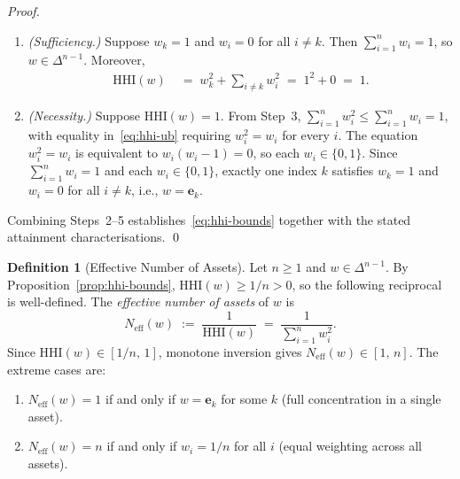 \documentclass[12pt,openany]{book}
\newcommand{\bfw}{\mathbf{w}}
\newcommand{\bfe}{\mathbf{e}}
\numberwithin{equation}{chapter}
\theoremstyle{plain}
\theoremstyle{definition}
\newtheorem{definition}[theorem]{Definition}
\theoremstyle{remark}
\def\bfw{w}%
\begin{document}
\begin{proof}
\begin{enumerate}
        \begin{enumerate}
          \item \emph{(Sufficiency.)}
                Suppose $w_k = 1$ and $w_i = 0$ for all $i \neq k$.
                Then $\sum_{i=1}^{n} w_i = 1$, so
                $\bfw \in \Delta^{n-1}$.  Moreover,
                \begin{align}
                  \mathrm{HHI}(\bfw)
                  &\;=\; w_k^2 + \sum_{i \neq k} w_i^2
                  \;=\; 1^2 + 0
                  \;=\; 1.
                  \label{eq:hhi-ub-suff}
                \end{align}

          \item \emph{(Necessity.)}
                Suppose $\mathrm{HHI}(\bfw) = 1$.
                From Step~3, $\sum_{i=1}^{n} w_i^2 \leq \sum_{i=1}^{n} w_i = 1$,
                with equality in~\eqref{eq:hhi-ub} requiring
                $w_i^2 = w_i$ for every $i$.
                The equation $w_i^2 = w_i$ is equivalent to
                $w_i(w_i - 1) = 0$, so each $w_i \in \{0,1\}$.
                Since $\sum_{i=1}^{n} w_i = 1$ and each $w_i \in \{0,1\}$,
                exactly one index $k$ satisfies $w_k = 1$ and
                $w_i = 0$ for all $i \neq k$,
                i.e., $\bfw = \bfe_k$.
        \end{enumerate}

\end{enumerate}

\noindent
Combining Steps~2--5 establishes~\eqref{eq:hhi-bounds} together
with the stated attainment characterisations.
\qed
\end{proof}

\begin{definition}[Effective Number of Assets]
\label{def:ena}
Let $n \geq 1$ and $\bfw \in \Delta^{n-1}$.
By Proposition~\ref{prop:hhi-bounds},
$\mathrm{HHI}(\bfw) \geq 1/n > 0$, so the following reciprocal
is well-defined.
The \emph{effective number of assets} of $\bfw$ is
\begin{equation}
  N_{\mathrm{eff}}(\bfw)
  \;:=\;
  \frac{1}{\mathrm{HHI}(\bfw)}
  \;=\;
  \frac{1}{\displaystyle\sum_{i=1}^{n} w_i^2}.
  \label{eq:ena}
\end{equation}
Since $\mathrm{HHI}(\bfw) \in [1/n,\, 1]$, monotone inversion gives
$N_{\mathrm{eff}}(\bfw) \in [1,\, n]$.
The extreme cases are:
\begin{enumerate}
  \item $N_{\mathrm{eff}}(\bfw) = 1$ if and only if
        $\bfw = \bfe_k$ for some $k$ (full concentration in a
        single asset).
  \item $N_{\mathrm{eff}}(\bfw) = n$ if and only if
        $w_i = 1/n$ for all $i$ (equal weighting across all assets).
\end{enumerate}
\end{definition}
\end{document}
